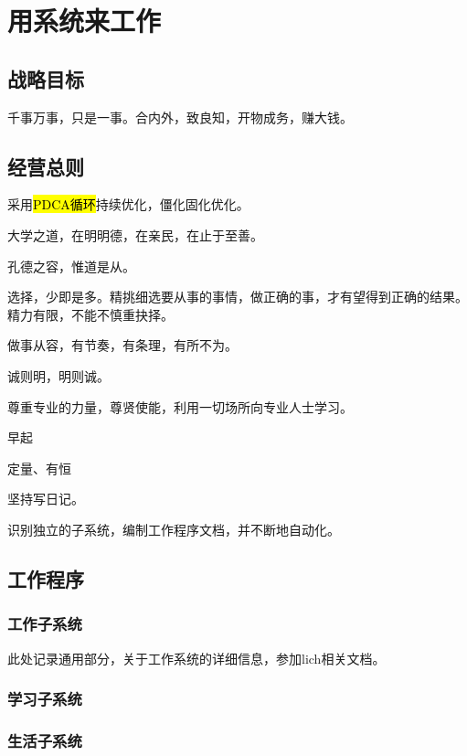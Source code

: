 \chapter{用系统来工作}

\section{战略目标}

千事万事，只是一事。合内外，致良知，开物成务，赚大钱。

\section{经营总则}

采用\hl{PDCA循环}持续优化，僵化固化优化。

大学之道，在明明德，在亲民，在止于至善。

孔德之容，惟道是从。

选择，少即是多。精挑细选要从事的事情，做正确的事，才有望得到正确的结果。
精力有限，不能不慎重抉择。

做事从容，有节奏，有条理，有所不为。

诚则明，明则诚。

尊重专业的力量，尊贤使能，利用一切场所向专业人士学习。

早起

定量、有恒

坚持写日记。

识别独立的子系统，编制工作程序文档，并不断地自动化。

\section{工作程序}

\subsection{工作子系统}

此处记录通用部分，关于工作系统的详细信息，参加lich相关文档。

\subsection{学习子系统}

\subsection{生活子系统}
